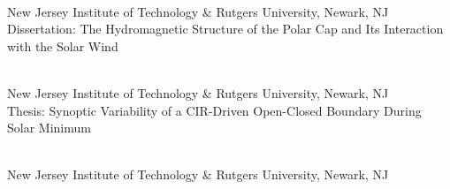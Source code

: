 \\  %
\indent New Jersey Institute of Technology \& Rutgers University, Newark, NJ\\  
\indent Dissertation: The Hydromagnetic Structure of the Polar Cap and Its Interaction with the Solar Wind

\\  %
\indent New Jersey Institute of Technology \& Rutgers University, Newark, NJ\\  
\indent Thesis: Synoptic Variability of a CIR-Driven Open-Closed Boundary During Solar Minimum

\\  %
\indent New Jersey Institute of Technology \& Rutgers University, Newark, NJ\\  
